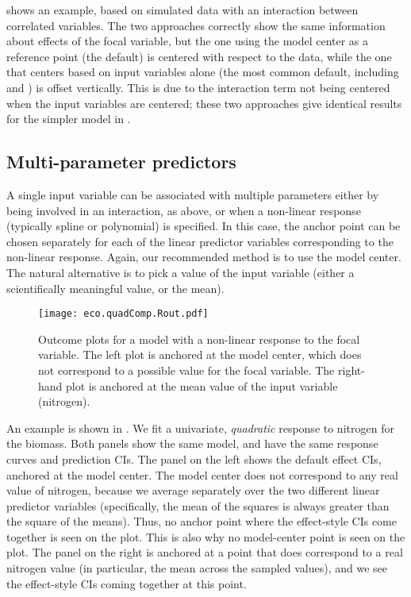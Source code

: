  shows an example, based on simulated data with an interaction between correlated variables. The two approaches correctly show the same information about effects of the focal variable, but the one using the model center as a reference point (the  default) is centered with respect to the data, while the one that centers based on input variables alone (the most common default, including  and ) is offset vertically. This is due to the interaction term not being centered when the input variables are centered; these two approaches give identical results for the simpler model in .

\subsection{Multi-parameter predictors}

A single input variable can be associated with multiple parameters either by being involved in an interaction, as above, or when a non-linear response (typically spline or polynomial) is specified. In this case, the anchor point can be chosen separately for each of the linear predictor variables corresponding to the non-linear response. Again, our recommended method is to use the model center. The natural alternative is to pick a value of the input variable (either a scientifically meaningful value, or the mean).

\begin{figure}
\begin{center}
\texttt{[image: eco.quadComp.Rout.pdf]}
\end{center}
\caption{Outcome plots for a model with a non-linear response to the focal variable. The left plot is anchored at the model center, which does not correspond to a possible value for the focal variable. The right-hand plot is anchored at the mean value of the input variable (nitrogen). }
\end{figure}

An example is shown in . We fit a univariate, \emph{quadratic} response to nitrogen for the biomass. Both panels show the same model, and have the same response curves and prediction CIs. The panel on the left shows the default effect CIs, anchored at the model center. The model center does not correspond to any real value of nitrogen, because we average separately over the two different linear predictor variables (specifically, the mean of the squares is always greater than the square of the means). Thus, no anchor point where the effect-style CIs come together is seen on the plot. This is also why no model-center point is seen on the plot. The panel on the right is anchored at a point that does correspond to a real nitrogen value (in particular, the mean across the sampled values), and we see the effect-style CIs coming together at this point.

